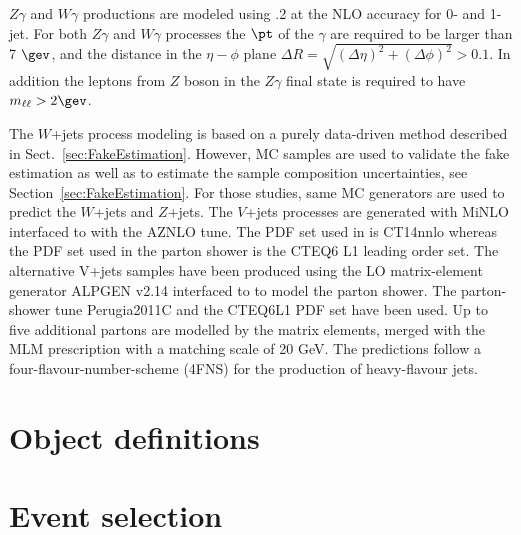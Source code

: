 $Z\gamma$ and $W\gamma$ productions are modeled using .2 at the NLO accuracy for 0- and 1-jet.
For both $Z\gamma$ and $W\gamma$ processes the $\pt$ of the $\gamma$ are
required to be larger than 7 $\gev$, and the distance in the $\eta - \phi$ plane
$\Delta R = \sqrt{(\Delta \eta)^{2} + (\Delta \phi)^{2}} > 0.1$.
In addition the leptons from $Z$ boson in the $Z\gamma$ final state is required to have $m_{\ell\ell} > 2 \gev$.

The $W$+jets process modeling is based on a purely data-driven method described in Sect.~\ref{sec:FakeEstimation}.
However, MC samples are used to validate the fake estimation as well as to estimate the sample composition uncertainties, see Section~\ref{sec:FakeEstimation}. For those studies, same MC generators are used to predict the $W$+jets and $Z$+jets.
The $V$+jets processes are generated with \POWHEG MiNLO interfaced to \PythiaEight with the AZNLO tune. 
The PDF set used in \POWHEG is CT14nnlo whereas the PDF set used in the parton shower is the CTEQ6 L1 leading order set.
The alternative V+jets samples have been produced using the LO matrix-element generator ALPGEN v2.14 interfaced to \PythiaSix to model the parton shower. The parton-shower tune Perugia2011C and the CTEQ6L1 PDF set have been used. 
Up to five additional partons are modelled by the matrix elements, merged with the MLM prescription with a matching scale of 20 GeV. 
The predictions follow a four-flavour-number-scheme (4FNS) for the production of heavy-flavour jets.

\section{Object definitions}
\section{Event selection}
